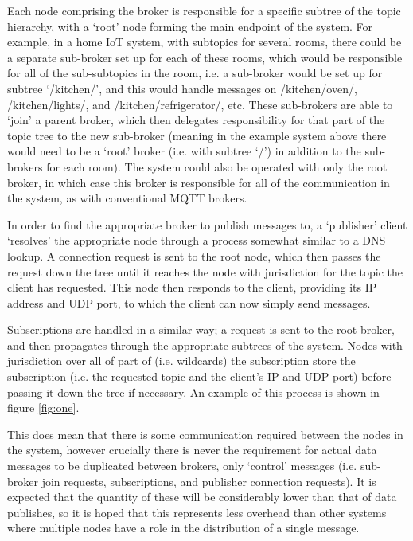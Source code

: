 \documentclass[conference, a4paper]{IEEEtran}
\begin{document}
        Each node comprising the broker is responsible for a specific subtree of the topic hierarchy, with a `root' node forming the main endpoint of the system.
        For example, in a home IoT system, with subtopics for several rooms, there could be a separate sub-broker set up for each of these rooms, which would be responsible for all of the sub-subtopics in the room, i.e. a sub-broker would be set up for subtree `/kitchen/', and this would handle messages on /kitchen/oven/, /kitchen/lights/, and /kitchen/refrigerator/, etc.
        These sub-brokers are able to `join' a parent broker, which then delegates responsibility for that part of the topic tree to the new sub-broker (meaning in the example system above there would need to be a `root' broker (i.e. with subtree `/') in addition to the sub-brokers for each room).
        The system could also be operated with only the root broker, in which case this broker is responsible for all of the communication in the system, as with conventional MQTT brokers.


        In order to find the appropriate broker to publish messages to, a `publisher' client `resolves' the appropriate node through a process somewhat similar to a DNS lookup.
        A connection request is sent to the root node, which then passes the request down the tree until it reaches the node with jurisdiction for the topic the client has requested.
        This node then responds to the client, providing its IP address and UDP port, to which the client can now simply send messages.


        Subscriptions are handled in a similar way; a request is sent to the root broker, and then propagates through the appropriate subtrees of the system.
        Nodes with jurisdiction over all of part of (i.e. wildcards) the subscription store the subscription (i.e. the requested topic and the client's IP and UDP port) before passing it down the tree if necessary.
        An example of this process is shown in figure \ref{fig:one}.


        This does mean that there is some communication required between the nodes in the system, however crucially there is never the requirement for actual data messages to be duplicated between brokers, only `control' messages (i.e. sub-broker join requests, subscriptions, and publisher connection requests).
        It is expected that the quantity of these will be considerably lower than that of data publishes, so it is hoped that this represents less overhead than other systems where multiple nodes have a role in the distribution of a single message.
\end{document}
